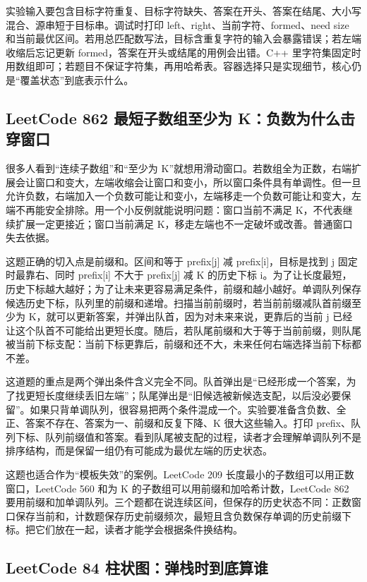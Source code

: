 实验输入要包含目标字符重复、目标字符缺失、答案在开头、答案在结尾、大小写混合、源串短于目标串。调试时打印 left、right、当前字符、formed、need size 和当前最优区间。若用总匹配数写法，目标含重复字符的输入会暴露错误；若左端收缩后忘记更新 formed，答案在开头或结尾的用例会出错。C++ 里字符集固定时用数组即可；若题目不保证字符集，再用哈希表。容器选择只是实现细节，核心仍是“覆盖状态”到底表示什么。

\subsection{LeetCode 862 最短子数组至少为 K：负数为什么击穿窗口}

很多人看到“连续子数组”和“至少为 K”就想用滑动窗口。若数组全为正数，右端扩展会让窗口和变大，左端收缩会让窗口和变小，所以窗口条件具有单调性。但一旦允许负数，右端加入一个负数可能让和变小，左端移走一个负数可能让和变大，左端不再能安全排除。用一个小反例就能说明问题：窗口当前不满足 K，不代表继续扩展一定更接近；窗口当前满足 K，移走左端也不一定破坏或改善。普通窗口失去依据。

这题正确的切入点是前缀和。区间和等于 prefix[j] 减 prefix[i]，目标是找到 j 固定时最靠右、同时 prefix[i] 不大于 prefix[j] 减 K 的历史下标 i。为了让长度最短，历史下标越大越好；为了让未来更容易满足条件，前缀和越小越好。单调队列保存候选历史下标，队列里的前缀和递增。扫描当前前缀时，若当前前缀减队首前缀至少为 K，就可以更新答案，并弹出队首，因为对未来来说，更靠后的当前 j 已经让这个队首不可能给出更短长度。随后，若队尾前缀和大于等于当前前缀，则队尾被当前下标支配：当前下标更靠后，前缀和还不大，未来任何右端选择当前下标都不差。

这道题的重点是两个弹出条件含义完全不同。队首弹出是“已经形成一个答案，为了找更短长度继续丢旧左端”；队尾弹出是“旧候选被新候选支配，以后没必要保留”。如果只背单调队列，很容易把两个条件混成一个。实验要准备含负数、全正、答案不存在、答案为一、前缀和反复下降、K 很大这些输入。打印 prefix、队列下标、队列前缀值和答案。看到队尾被支配的过程，读者才会理解单调队列不是排序结构，而是保留一组仍有可能成为最优左端的历史状态。

这题也适合作为“模板失效”的案例。LeetCode 209 长度最小的子数组可以用正数窗口，LeetCode 560 和为 K 的子数组可以用前缀和加哈希计数，LeetCode 862 要用前缀和加单调队列。三个题都在说连续区间，但保存的历史状态不同：正数窗口保存当前和，计数题保存历史前缀频次，最短且含负数保存单调的历史前缀下标。把它们放在一起，读者才能学会根据条件换结构。

\subsection{LeetCode 84 柱状图：弹栈时到底算谁}

